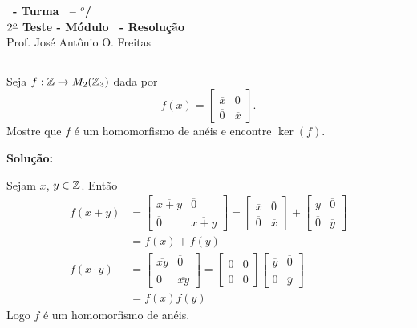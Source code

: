 \documentclass[12pt]{exam}
\begin{document}
\begin{center}
{\Large\bf \disciplina\ - Turma \turma\ -- \semestre$^{o}$/\ano} \\ \vspace{9pt} {\large\bf
$2^{\underline{o}}$ Teste - M\'odulo \modulo\ - Resolu\c{c}\~ao}\\
\vspace{9pt} Prof. Jos{\'e} Ant{\^o}nio O. Freitas
\end{center}
\hrule

\vspace{.6cm}

\questao{} Seja $f : \mathbb{Z} \to M_2(\mathbb{Z}_3)$ dada por
\[
	f(x) = \begin{bmatrix}
		\overline{x} & \overline{0}\\
		\overline{0} & \overline{x}
	\end{bmatrix}.
\]
Mostre que $f$ \'e um homomorfismo de an\'eis e encontre $\ker(f)$.

\noindent\textbf{Solu\c{c}\~ao:}

Sejam $x$, $y \in \mathbb{Z}$. Ent\~ao
\begin{align*}
	f(x + y) &= \begin{bmatrix}
		\overline{x + y} & \overline{0}\\
		\overline{0} & \overline{x + y}
	\end{bmatrix} = \begin{bmatrix}
		\overline{x} & \overline{0}\\
		\overline{0} & \overline{x}
	\end{bmatrix} + \begin{bmatrix}
		\overline{y} & \overline{0}\\
		\overline{0} & \overline{y}
	\end{bmatrix}\\ &= f(x) + f(y)\\
	f(x\cdot y) &= \begin{bmatrix}
		\overline{xy} & \overline{0}\\
		\overline{0} & \overline{xy}
	\end{bmatrix} = \begin{bmatrix}
		\overline{0} & \overline{0}\\
		\overline{0} & \overline{0}
	\end{bmatrix} \begin{bmatrix}
		\overline{y} & \overline{0}\\
		\overline{0} & \overline{y}
	\end{bmatrix}\\ &= f(x)f(y)
\end{align*}
Logo $f$ \'e um homomorfismo de an\'eis.
\end{document}
